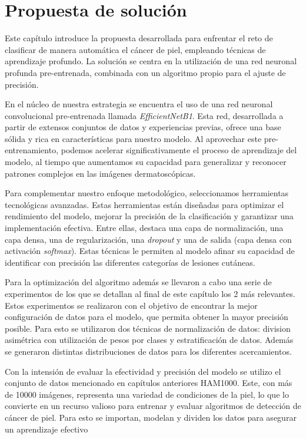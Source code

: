 \chapter{Propuesta de solución}\label{chapter:proposal}

Este capítulo introduce la propuesta desarrollada para enfrentar el reto de clasificar de manera automática el cáncer de piel, empleando técnicas de aprendizaje profundo. La solución se centra en la utilización de una red neuronal profunda pre-entrenada, combinada con un algoritmo propio para el ajuste de precisión.

En el núcleo de nuestra estrategia se encuentra el uso de una red neuronal convolucional pre-entrenada llamada \textit{EfficientNetB1}. Esta red, desarrollada a partir de extensos conjuntos de datos y experiencias previas, ofrece una base sólida y rica en características para nuestro modelo. Al aprovechar este pre-entrenamiento, podemos acelerar significativamente el proceso de aprendizaje del modelo, al tiempo que aumentamos su capacidad para generalizar y reconocer patrones complejos en las imágenes dermatoscópicas.

Para complementar nuestro enfoque metodológico, seleccionamos herramientas tecnológicas avanzadas. Estas herramientas están diseñadas para optimizar el rendimiento del modelo, mejorar la precisión de la clasificación y garantizar una implementación efectiva. Entre ellas, destaca una capa de normalización, una capa densa, una de regularización, una \textit{dropout} y una de salida (capa densa con activación \textit{softmax}). Estas técnicas le permiten al modelo afinar su capacidad de identificar con precisión las diferentes categorías de lesiones cutáneas.

Para la optimización del algoritmo además se llevaron a cabo una serie de experimentos de los que se detallan al final de este capítulo los 2 más relevantes. Estos experimentos se realizaron con el objetivo de encontrar la mejor configuración de datos para el modelo, que permita obtener la mayor precisión posible. Para esto se utilizaron dos técnicas de normalización de datos: division asimétrica con utilización de pesos por clases y estratificación de datos. Además se generaron distintas distribuciones de datos para los diferentes acercamientos.

Con la intensión de evaluar la efectividad y precisión del modelo se utilizo el conjunto de datos mencionado en capítulos anteriores HAM1000. Este, con más de 10000 imágenes, representa una variedad de condiciones de la piel, lo que lo convierte en un recurso valioso para entrenar y evaluar algoritmos de detección de cáncer de piel. Para esto se importan, modelan y dividen los datos para asegurar un aprendizaje efectivo

